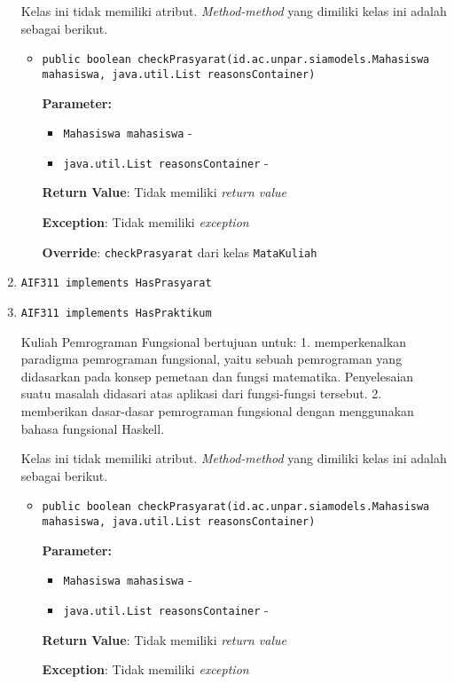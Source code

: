 \documentclass{article}
\begin{document}
\begin{enumerate}
Kelas ini tidak memiliki atribut. \textit{Method-method} yang dimiliki kelas ini adalah sebagai berikut.
\begin{itemize}
\item \texttt{public boolean checkPrasyarat(id.ac.unpar.siamodels.Mahasiswa mahasiswa, java.util.List reasonsContainer)}



\textbf{Parameter:}
\begin{itemize}
\item \texttt{Mahasiswa mahasiswa} - 
\item \texttt{java.util.List reasonsContainer} - 
\end{itemize}
\textbf{Return Value}: Tidak memiliki \textit{return value}

\textbf{Exception}: Tidak memiliki \textit{exception}

\textbf{Override}: \texttt{checkPrasyarat} dari kelas \texttt{MataKuliah}

\end{itemize}
\item \texttt{AIF311 implements HasPrasyarat}

\item \texttt{AIF311 implements HasPraktikum}

Kuliah Pemrograman Fungsional bertujuan untuk: 1. memperkenalkan paradigma
 pemrograman fungsional, yaitu sebuah pemrograman yang didasarkan pada konsep
 pemetaan dan fungsi matematika. Penyelesaian suatu masalah didasari atas
 aplikasi dari fungsi-fungsi tersebut. 2. memberikan dasar-dasar pemrograman
 fungsional dengan menggunakan bahasa fungsional Haskell.

Kelas ini tidak memiliki atribut. \textit{Method-method} yang dimiliki kelas ini adalah sebagai berikut.
\begin{itemize}
\item \texttt{public boolean checkPrasyarat(id.ac.unpar.siamodels.Mahasiswa mahasiswa, java.util.List reasonsContainer)}



\textbf{Parameter:}
\begin{itemize}
\item \texttt{Mahasiswa mahasiswa} - 
\item \texttt{java.util.List reasonsContainer} - 
\end{itemize}
\textbf{Return Value}: Tidak memiliki \textit{return value}

\textbf{Exception}: Tidak memiliki \textit{exception}


\end{itemize}
\end{enumerate}
\end{document}
